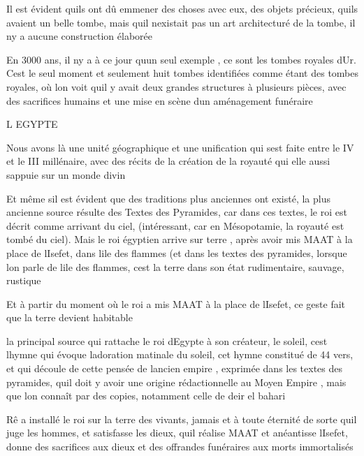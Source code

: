 \documentclass{article}
\begin{document}
Il est évident qu{\textquotesingle}ils ont dû emmener des choses avec
eux,  des objets précieux, qu{\textquotesingle}ils avaient un belle
tombe, mais qu{\textquotesingle}il n{\textquotesingle}existait pas un
art architecturé de la tombe, il n{\textquotesingle}y a aucune
construction élaborée

En 3000 ans,  il n{\textquotesingle}y a  à ce jour
qu{\textquotesingle}un seul exemple , ce sont les tombes royales
d{\textquotesingle}Ur. C{\textquotesingle}est le seul moment et
seulement huit tombes identifiées comme étant des tombes royales, où
l{\textquotesingle}on voit qu{\textquotesingle}il y avait deux grandes
structures à plusieurs pièces, avec des sacrifices humains et une mise
en scène d{\textquotesingle}un aménagement funéraire

 L{\textquotesingle} EGYPTE

Nous avons là une unité géographique et une unification qui
s{\textquotesingle}est faite entre le IV et le III millénaire, avec des
récits de la création de la royauté qui elle aussi
s{\textquotesingle}appuie sur un monde divin

Et même s{\textquotesingle}il est évident que des traditions plus
anciennes ont existé, la plus ancienne source résulte des Textes des
Pyramides, car dans ces textes, le roi est décrit comme arrivant du
ciel, (intéressant, car en Mésopotamie, la royauté est tombé du ciel).
Mais le roi égyptien arrive sur terre , après avoir mis MAAT à la place
de l{\textquotesingle}Isefet, dans l{\textquotesingle}ile des flammes
(et dans les textes des pyramides, lorsque l{\textquotesingle}on parle
de l{\textquotesingle}ile des flammes, c{\textquotesingle}est la terre
dans son état rudimentaire, sauvage, rustique

Et  à partir du moment où le roi a mis MAAT à la place de
l{\textquotesingle}Isefet, ce geste fait que la terre devient habitable

la principal source qui rattache le roi d{\textquotesingle}Egypte à son
créateur, le soleil, c{\textquotesingle}est l{\textquotesingle}hymne
qui évoque l{\textquotesingle}adoration matinale du soleil, cet hymne
constitué de 44 vers, et qui découle de cette pensée de
l{\textquotesingle}ancien empire , exprimée dans les textes des
pyramides, qu{\textquotesingle}il doit y avoir une origine
rédactionnelle au Moyen Empire , mais que l{\textquotesingle}on connaît
par des copies, notamment celle de deir el bahari

Rê a installé le roi sur la terre des vivants,  jamais et à toute
éternité de sorte qu{\textquotesingle}il juge les hommes, et satisfasse
les dieux, qu{\textquotesingle}il réalise MAAT et anéantisse
l{\textquotesingle}Isefet, donne des sacrifices aux dieux et des
offrandes funéraires aux morts immortalisés
\end{document}

